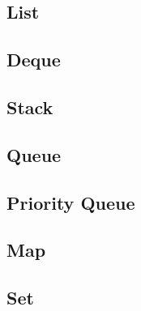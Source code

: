 \subsection{List}

\subsection{Deque}

\subsection{Stack}

\subsection{Queue}

\subsection{Priority Queue}

\subsection{Map}

\subsection{Set}


\pagebreak
